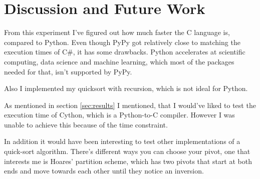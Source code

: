 \section{Discussion and Future Work}

From this experiment I've figured out how much faster the C language is, compared to Python. Even though PyPy got relatively close to matching the execution times of C\#, it has some drawbacks. Python accelerates at scientific computing, data science and machine learning, which most of the packages needed for that, isn't supported by PyPy.

\noindent Also I implemented my quicksort with recursion, which is not ideal for Python\cite{rec_python}. 

\noindent As mentioned in section \ref{sec:results} I mentioned, that I would've liked to test the execution time of Cython, which is a Python-to-C compiler\cite{info_world_cython}. However I was unable to achieve this because of the time constraint. 

\noindent In addition it would have been interesting to test other implementations of a quick-sort algorithm. There's different ways you can choose your pivot, one that interests me is Hoares' partition scheme, which has two pivots that start at both ends and move towards each other until they notice an inversion.
